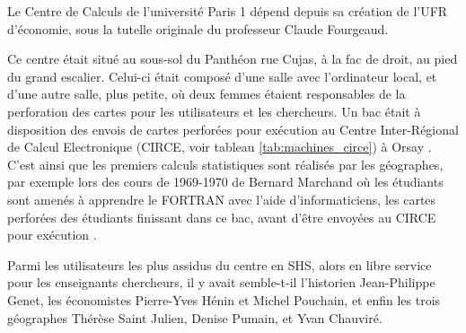 





Le Centre de Calculs de l'université Paris 1 dépend depuis sa création de l'UFR d'économie, sous la tutelle originale du professeur Claude Fourgeaud.

Ce centre était situé au sous-sol du Panthéon rue Cujas, à la fac de droit, au pied du grand escalier. Celui-ci était composé d'une salle avec l'ordinateur local, et d'une autre salle, plus petite, où deux femmes étaient responsables de la perforation des cartes pour les utilisateurs et les chercheurs. Un bac était à disposition des envois de cartes perforées pour exécution au Centre Inter-Régional de Calcul Electronique (CIRCE, voir tableau \ref{tab:machines_circe}) à Orsay  . C'est ainsi que les premiers calculs statistiques sont réalisés par les géographes, par exemple lors des cours de 1969-1970 de Bernard Marchand où les étudiants sont amenés à apprendre le FORTRAN avec l'aide d'informaticiens, les cartes perforées des étudiants finissant dans ce bac, avant d'être envoyées au CIRCE pour exécution \autocite[127]{Cuyala2014}.

Parmi les utilisateurs les plus assidus du centre en SHS, alors en libre service pour les enseignants chercheurs, il y avait semble-t-il l'historien Jean-Philippe Genet, les économistes Pierre-Yves Hénin et Michel Pouchain, et enfin les trois géographes Thérèse Saint Julien, Denise Pumain, et Yvan Chauviré.

